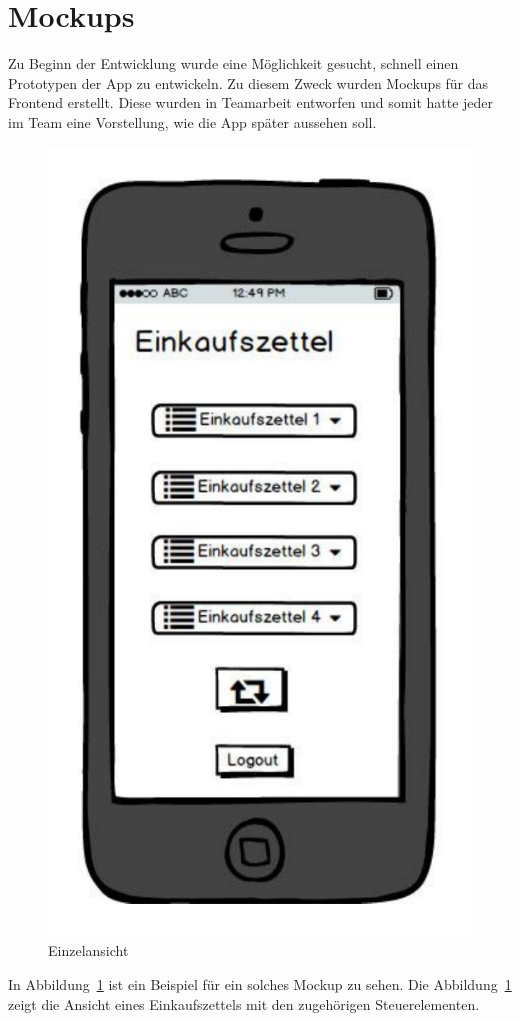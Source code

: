\documentclass[10pt, conference, compsocconf]{IEEEtran}
\begin{document}
\section{Mockups}
Zu Beginn der Entwicklung wurde eine M\"oglichkeit gesucht, schnell einen Prototypen der App zu entwickeln.
Zu diesem Zweck wurden Mockups f\"ur das Frontend erstellt. 
Diese wurden in Teamarbeit entworfen und somit hatte jeder im Team eine Vorstellung, wie die App sp\"ater aussehen soll.
\begin{figure}[h!]
	\centering
	\includegraphics[scale=0.3]{./Bilder_Zeichnungen/Uebersicht.pdf}
	\caption{Einzelansicht}
	\label{fig:Mockup_Einzelansicht}
\end{figure}
In Abbildung~\ref{fig:Mockup_Einzelansicht} ist ein Beispiel f\"ur ein solches Mockup zu sehen. Die Abbildung~\ref{fig:Mockup_Einzelansicht} zeigt die Ansicht eines Einkaufszettels mit den zugeh\"origen Steuerelementen.
\end{document}
